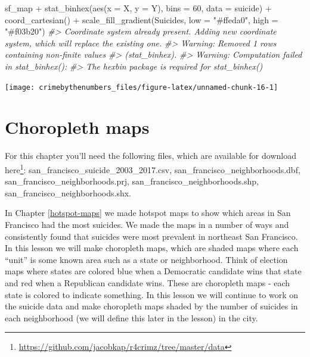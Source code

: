 \documentclass[
]{krantz}
\makeatletter
\newenvironment{Shaded}{\begin{snugshade}}{\end{snugshade}}
\newcommand{\AttributeTok}[1]{\textcolor[rgb]{0.61,0.61,0.61}{#1}}
\newcommand{\CommentTok}[1]{\textcolor[rgb]{0.37,0.37,0.37}{\textit{#1}}}
\newcommand{\DecValTok}[1]{\textcolor[rgb]{0.06,0.06,0.06}{#1}}
\newcommand{\FunctionTok}[1]{\textcolor[rgb]{0,0,0}{#1}}
\newcommand{\NormalTok}[1]{#1}
\newcommand{\SpecialCharTok}[1]{\textcolor[rgb]{0,0,0}{#1}}
\newcommand{\StringTok}[1]{\textcolor[rgb]{0.5,0.5,0.5}{#1}}
\renewcommand{\href}[2]{#2\footnote{\url{#1}}}
\newenvironment{kframe}{%
\medskip{}
\setlength{\fboxsep}{.8em}
 \def\at@end@of@kframe{}%
 \ifinner\ifhmode%
  \def\at@end@of@kframe{\end{minipage}}%
  \begin{minipage}{\columnwidth}%
 \fi\fi%
 \def\FrameCommand##1{\hskip\@totalleftmargin \hskip-\fboxsep
 \colorbox{shadecolor}{##1}\hskip-\fboxsep
     \hskip-\linewidth \hskip-\@totalleftmargin \hskip\columnwidth}%
 \MakeFramed {\advance\hsize-\width
   \@totalleftmargin\z@ \linewidth\hsize
   \@setminipage}}%
 {\par\unskip\endMakeFramed%
 \at@end@of@kframe}
\renewenvironment{Shaded}{\begin{kframe}}{\end{kframe}}
\makeatother
\begin{document}
\begin{Shaded}
\begin{Highlighting}[]
\NormalTok{sf\_map }\SpecialCharTok{+}
  \FunctionTok{stat\_binhex}\NormalTok{(}\FunctionTok{aes}\NormalTok{(}\AttributeTok{x =}\NormalTok{ X, }\AttributeTok{y =}\NormalTok{ Y),}
              \AttributeTok{bins  =} \DecValTok{60}\NormalTok{,}
              \AttributeTok{data =}\NormalTok{ suicide) }\SpecialCharTok{+}
  \FunctionTok{coord\_cartesian}\NormalTok{() }\SpecialCharTok{+}
  \FunctionTok{scale\_fill\_gradient}\NormalTok{(}\StringTok{\textquotesingle{}Suicides\textquotesingle{}}\NormalTok{,}
                      \AttributeTok{low =} \StringTok{"\#ffeda0"}\NormalTok{,}
                      \AttributeTok{high =} \StringTok{"\#f03b20"}\NormalTok{)}
\CommentTok{\#\textgreater{} Coordinate system already present. Adding new coordinate system, which will replace the existing one.}
\CommentTok{\#\textgreater{} Warning: Removed 1 rows containing non{-}finite values}
\CommentTok{\#\textgreater{} (stat\_binhex).}
\CommentTok{\#\textgreater{} Warning: Computation failed in \textasciigrave{}stat\_binhex()\textasciigrave{}:}
\CommentTok{\#\textgreater{} The \textasciigrave{}hexbin\textasciigrave{} package is required for \textasciigrave{}stat\_binhex()\textasciigrave{}}
\end{Highlighting}
\end{Shaded}

\begin{center}\texttt{[image: crimebythenumbers\_files/figure-latex/unnamed-chunk-16-1]} \end{center}

\hypertarget{choropleth-maps}{%
\chapter{Choropleth maps}\label{choropleth-maps}}

For this chapter you'll need the following files, which are available for download \href{https://github.com/jacobkap/r4crimz/tree/master/data}{here}: san\_francisco\_suicide\_2003\_2017.csv, san\_francisco\_neighborhoods.dbf, san\_francisco\_neighborhoods.prj, san\_francisco\_neighborhoods.shp, san\_francisco\_neighborhoods.shx.

In Chapter \ref{hotspot-maps} we made hotspot maps to show which areas in San Francisco had the most suicides. We made the maps in a number of ways and consistently found that suicides were most prevalent in northeast San Francisco. In this lesson we will make choropleth maps, which are shaded maps where each ``unit'' is some known area such as a state or neighborhood. Think of election maps where states are colored blue when a Democratic candidate wins that state and red when a Republican candidate wins. These are choropleth maps - each state is colored to indicate something. In this lesson we will continue to work on the suicide data and make choropleth maps shaded by the number of suicides in each neighborhood (we will define this later in the lesson) in the city.
\end{document}

